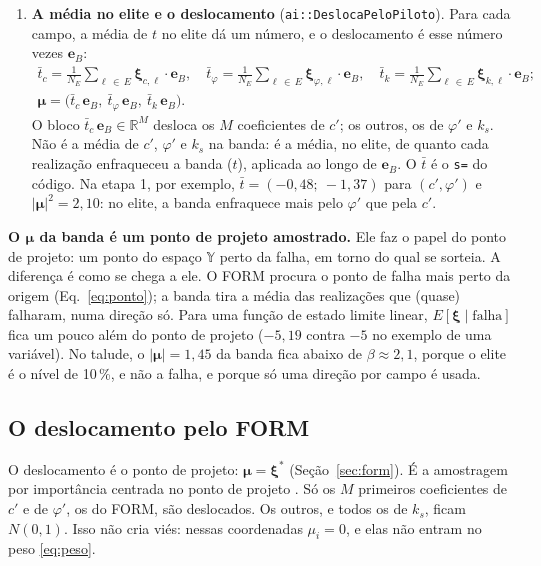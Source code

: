 \documentclass[11pt,a4paper]{article}
\newcommand{\Y}{\mathbb{Y}}
\newcommand{\xib}{\bm\xi}
\newcommand{\FS}{\mathrm{FS}}
\begin{document}
\begin{enumerate}
    válidas, o elite passa a ser os 10\,\% de menor FS, o nível intermediário $\FS \le \gamma_e$ da entropia cruzada
    \citep{rubinstein2004}. Aqui, sim, entram os $\xib$ que geram realizações que (quase) falham.
  \item \textbf{A média no elite e o deslocamento} (\texttt{ai::DeslocaPeloPiloto}). Para cada campo, a média de $t$ no
    elite dá um número, e o deslocamento é esse número vezes $\bm e_B$:
    \begin{equation}
      \begin{gathered}
      \bar t_c = \frac{1}{N_E}\sum_{\ell\,\in\,E} \xib_{c,\ell}\cdot\bm e_B, \quad
      \bar t_\varphi = \frac{1}{N_E}\sum_{\ell\,\in\,E} \xib_{\varphi,\ell}\cdot\bm e_B, \quad
      \bar t_k = \frac{1}{N_E}\sum_{\ell\,\in\,E} \xib_{k,\ell}\cdot\bm e_B;\\
      \bm\mu = \big(\bar t_c\,\bm e_B,\ \bar t_\varphi\,\bm e_B,\ \bar t_k\,\bm e_B\big).
      \end{gathered}
      \label{eq:mubanda}
    \end{equation}
    O bloco $\bar t_c\,\bm e_B \in \mathbb R^M$ desloca os $M$ coeficientes de $c'$; os outros, os de $\varphi'$ e $k_s$.
    Não é a média de $c'$, $\varphi'$ e $k_s$ na banda: é a média, no elite, de quanto cada realização enfraqueceu a banda
    ($t$), aplicada ao longo de $\bm e_B$. O $\bar t$ é o \texttt{s=} do código. Na etapa 1, por exemplo,
    $\bar t = (-0{,}48;\ -1{,}37)$ para $(c', \varphi')$ e $|\bm\mu|^2 = 2{,}10$: no elite, a banda enfraquece mais pelo
    $\varphi'$ que pela $c'$.
\end{enumerate}
\textbf{O $\bm\mu$ da banda é um ponto de projeto amostrado.} Ele faz o papel do ponto de projeto: um ponto do espaço
$\Y$ perto da falha, em torno do qual se sorteia. A diferença é como se chega a ele. O FORM procura o ponto de falha mais
perto da origem (Eq.~\ref{eq:ponto}); a banda tira a média das realizações que (quase) falharam, numa direção só. Para
uma função de estado limite linear, $E[\xib \mid \text{falha}]$ fica um pouco além do ponto de projeto ($-5{,}19$ contra
$-5$ no exemplo de uma variável). No talude, o $|\bm\mu| = 1{,}45$ da banda fica abaixo de $\beta \approx 2{,}1$, porque o
elite é o nível de 10\,\%, e não a falha, e porque só uma direção por campo é usada.

\subsection{O deslocamento pelo FORM}\label{sec:aiform}
O deslocamento é o ponto de projeto: $\bm\mu = \xib^*$ (Seção~\ref{sec:form}). É a amostragem por importância centrada no
ponto de projeto \citep[Seç.~6.3.3, Eq.~6.28]{beck2014}. Só os $M$ primeiros coeficientes de $c'$ e de $\varphi'$, os
do FORM, são deslocados. Os outros, e todos os de $k_s$, ficam $N(0, 1)$. Isso não cria viés: nessas coordenadas
$\mu_i = 0$, e elas não entram no peso \eqref{eq:peso}.
\end{document}
